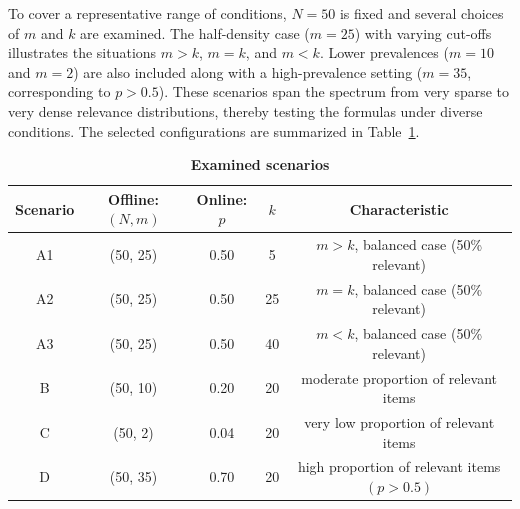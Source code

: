 \documentclass{tpms-l}
\theoremstyle{definition}
\theoremstyle{remark}
\numberwithin{equation}{section}
\begin{document}
To cover a representative range of conditions, $N=50$  is fixed and several choices of $m$ and $k$ are examined. The half-density case ($m=25$) with varying cut-offs illustrates the situations $m>k$, $m=k$, and $m<k$. Lower prevalences ($m=10$ and $m=2$) are also included along with a high-prevalence setting ($m=35$, corresponding to $p>0.5$). These scenarios span the spectrum from very sparse to very dense relevance distributions, thereby testing the formulas under diverse conditions. The selected configurations are summarized in Table~\ref{table1}.
\begin{center}
   	\begin{table}[ht] \footnotesize
		\caption{\textbf{Examined scenarios}}\vspace{-8pt}
		\centering
		\begin{tabular}{|c|c|c|c|c|} 
			\hline
			\textbf{Scenario}   	& \textbf{Offline: $(N,m)$}& \textbf{Online: $p$} &\textbf{ $k$} &\textbf{ Characteristic }\\
			
			\hline
			A1   & (50, 25) 			& 	0.50			 & 5		   & $m>k$, balanced case (50\% relevant)	\\ \hline
			A2	& (50, 25) 			&	 0.50			 & 25 	   & $m=k$, balanced case (50\% relevant)  	\\ \hline
			A3	& (50, 25) 			&	0.50			 & 40		   & $m<k$, balanced case (50\% relevant)	\\
			\hline
			B   & (50, 10) 			& 	0.20			 & 20		   & moderate proportion of relevant items	\\ \hline
			C	& (50, 2) 			&	 0.04			 & 20 	   & very low proportion of relevant items  	\\ \hline
			D	& (50, 35) 			&	0.70			 & 20		   & high proportion of relevant items $(p > 0.5)$	\\
            \hline%
		\end{tabular}
		\label{table1}
	\end{table}
\end{center}
\vspace{10pt}
\end{document}
